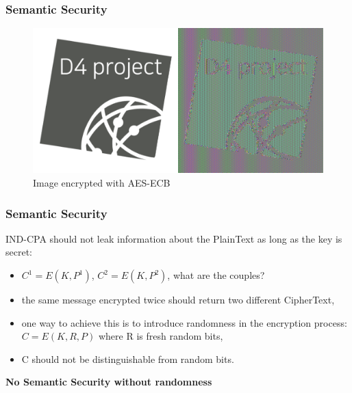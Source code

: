 \documentclass{beamer}
\begin{document}
\begin{frame}
        \frametitle{Semantic Security}
        \begin{figure}
          \centering
          \includegraphics[width=\textwidth]{d4-ecb.pdf}
          \caption{Image encrypted with AES-ECB}
        \end{figure}
        
\end{frame}


\begin{frame}
        \frametitle{Semantic Security}

        IND-CPA should not leak information about the PlainText as long as the
        key is secret:

        \begin{itemize}
          \item $C^1 = E(K, P^1)$, $C^2 = E(K, P^2)$, what are the couples?
          \item the same message encrypted twice should return two different CipherText,
          \item one way to achieve this is to introduce randomness in the
            encryption process: $C = E(K ,R ,P )$ where R is fresh random bits,
          \item C should not be distinguishable from random bits.
        \end{itemize}

        {\bf No Semantic Security without randomness}

\end{frame}
\end{document}
